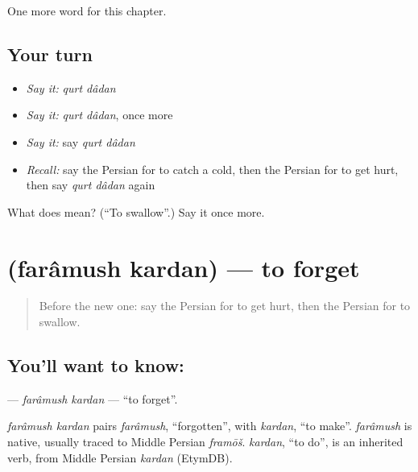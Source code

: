\begin{grammarlens}[title={What you've built}]
One more word for this chapter.
\end{grammarlens}

\subsection*{Your turn}
\begin{itemize}
\raggedright
  \item \emph{Say it:} \emph{qurt dâdan}
  \item \emph{Say it:} \emph{qurt dâdan}, once more
  \item \emph{Say it:} say \emph{qurt dâdan}
  \item \emph{Recall:} say the Persian for to catch a cold, then the Persian for to get hurt, then say \emph{qurt dâdan} again
\end{itemize}

\begin{tcolorbox}[breakable,colback=teal!4,colframe=teal!35!black,title={Before you move on}]
What does   mean? (\textquotedblleft{}To swallow\textquotedblright{}.) Say it once more.
\end{tcolorbox}
\section[\texorpdfstring{\fa{فراموش} \fa{کردن} (farâmush kardan)}{فراموش کردن (farâmush kardan)}]{  (farâmush kardan) — to forget}

\label{lesson:FA-C143-faramush-kardan}



\begin{quote}
Before the new one: say the Persian for to get hurt, then the Persian for to swallow.
\end{quote}

\subsection*{You'll want to know:  }
\textbf{ } — \emph{farâmush kardan} — \textquotedblleft{}to forget\textquotedblright{}.

\begin{cousinweb}
\emph{farâmush kardan} pairs \emph{farâmush}, \textquotedblleft{}forgotten\textquotedblright{}, with \emph{kardan}, \textquotedblleft{}to make\textquotedblright{}. \emph{farâmush} is native, usually traced to Middle Persian \emph{framōš}. \emph{kardan}, \textquotedblleft{}to do\textquotedblright{}, is an inherited verb, from Middle Persian \emph{kardan} (EtymDB).
\end{cousinweb}

